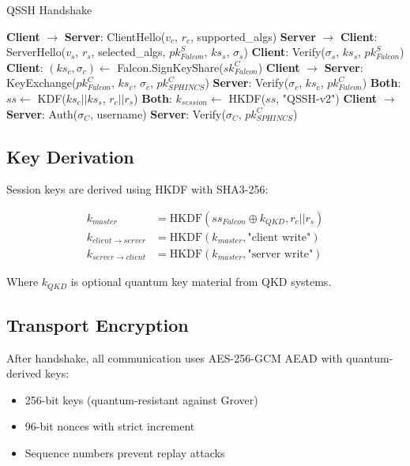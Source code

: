 \documentclass[11pt,a4paper]{article}
\begin{document}
\begin{algorithm}
\caption{QSSH Handshake}
\begin{algorithmic}[1]
\STATE \textbf{Client} $\rightarrow$ \textbf{Server}: ClientHello($v_c$, $r_c$, supported\_algs)
\STATE \textbf{Server} $\rightarrow$ \textbf{Client}: ServerHello($v_s$, $r_s$, selected\_algs, $pk_{Falcon}^S$, $ks_s$, $\sigma_s$)
\STATE \textbf{Client}: Verify($\sigma_s$, $ks_s$, $pk_{Falcon}^S$)
\STATE \textbf{Client}: $(ks_c, \sigma_c) \leftarrow$ Falcon.SignKeyShare($sk_{Falcon}^C$)
\STATE \textbf{Client} $\rightarrow$ \textbf{Server}: KeyExchange($pk_{Falcon}^C$, $ks_c$, $\sigma_c$, $pk_{SPHINCS}^C$)
\STATE \textbf{Server}: Verify($\sigma_c$, $ks_c$, $pk_{Falcon}^C$)
\STATE \textbf{Both}: $ss \leftarrow$ KDF($ks_c || ks_s$, $r_c || r_s$)
\STATE \textbf{Both}: $k_{session} \leftarrow$ HKDF($ss$, "QSSH-v2")
\STATE \textbf{Client} $\rightarrow$ \textbf{Server}: Auth($\sigma_C$, username)
\STATE \textbf{Server}: Verify($\sigma_C$, $pk_{SPHINCS}^C$)
\end{algorithmic}
\end{algorithm}

\subsection{Key Derivation}

Session keys are derived using HKDF with SHA3-256:

\begin{align}
k_{master} &= \text{HKDF}(ss_{Falcon} \oplus k_{QKD}, r_c || r_s) \\
k_{client \rightarrow server} &= \text{HKDF}(k_{master}, \text{"client write"}) \\
k_{server \rightarrow client} &= \text{HKDF}(k_{master}, \text{"server write"})
\end{align}

Where $k_{QKD}$ is optional quantum key material from QKD systems.

\subsection{Transport Encryption}

After handshake, all communication uses AES-256-GCM AEAD with quantum-derived keys:
\begin{itemize}
    \item 256-bit keys (quantum-resistant against Grover)
    \item 96-bit nonces with strict increment
    \item Sequence numbers prevent replay attacks
\end{itemize}
\end{document}
